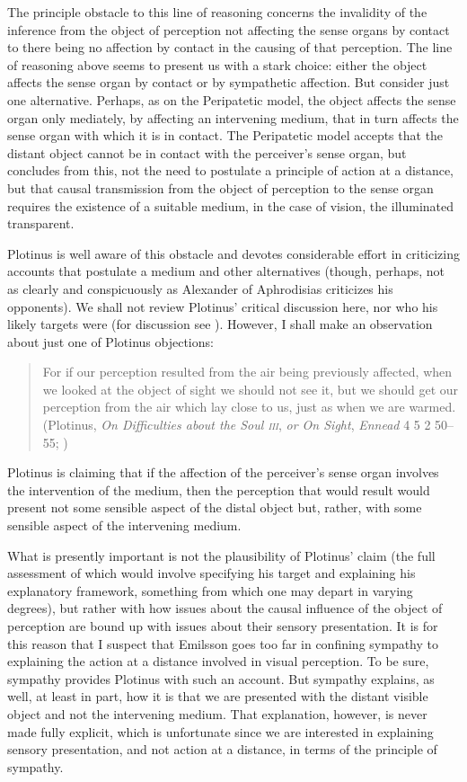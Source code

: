 The principle obstacle to this line of reasoning concerns the invalidity of the inference from the object of perception not affecting the sense organs by contact to there being no affection by contact in the causing of that perception. The line of reasoning above seems to present us with a stark choice: either the object affects the sense organ by contact or by sympathetic affection. But consider just one alternative. Perhaps, as on the Peripatetic model, the object affects the sense organ only mediately, by affecting an intervening medium, that in turn affects the sense organ with which it is in contact. The Peripatetic model accepts that the distant object cannot be in contact with the perceiver's sense organ, but concludes from this, not the need to postulate a principle of action at a distance, but that causal transmission from the object of perception to the sense organ requires the existence of a suitable medium, in the case of vision, the illuminated transparent.

Plotinus is well aware of this obstacle and devotes considerable effort in criticizing accounts that postulate a medium and other alternatives (though, perhaps, not as clearly and conspicuously as Alexander of Aphrodisias criticizes his opponents). We shall not review Plotinus' critical discussion here, nor who his likely targets were (for discussion see \citealt[chapter 3.1]{Emilsson:1988uq}). However, I shall make an observation about just one of Plotinus objections:
\begin{quote}
	For if our perception resulted from the air being previously affected, when we looked at the object of sight we should not see it, but we should get our perception from the air which lay close to us, just as when we are warmed. (Plotinus, \emph{On Difficulties about the Soul \textsc{iii}}, \emph{or On Sight}, \emph{Ennead} 4 5 2 50--55; \citealt[289]{Armstrong:1984aa})
\end{quote}
Plotinus is claiming that if the affection of the perceiver's sense organ involves the intervention of the medium, then the perception that would result would present not some sensible aspect of the distal object but, rather, with some sensible aspect of the intervening medium. 

What is presently important is not the plausibility of Plotinus' claim (the full assessment of which would involve specifying his target and explaining his explanatory framework, something from which one may depart in varying degrees), but rather with how issues about the causal influence of the object of perception are bound up with issues about their sensory presentation. It is for this reason that I suspect that Emilsson goes too far in confining sympathy to explaining the action at a distance involved in visual perception. To be sure, sympathy provides Plotinus with such an account. But sympathy explains, as well, at least in part, how it is that we are presented with the distant visible object and not the intervening medium. That explanation, however, is never made fully explicit, which is unfortunate since we are interested in explaining sensory presentation, and not action at a distance, in terms of the principle of sympathy.

